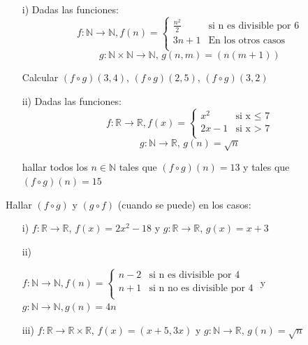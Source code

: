 \documentclass[10pt]{article}
\begin{document}
\begin{ej}
\begin{itemize}
	\item[i)] Dadas las funciones:
		\begin{displaymath}
			f: \mathbb{N} \rightarrow \mathbb{N}, f(n)=\left\{\begin{array}{cc}
				 \frac{n^2}{2} & \mbox{si n es divisible por 6} \\
						3n + 1 & \mbox{En los otros casos}  \\
			 \end{array}\right.	
		\end{displaymath}	
		$$g : \mathbb{N} \times \mathbb{N} \rightarrow \mathbb{N}, \, g(n, m) = (n(m + 1))$$
	
	Calcular $(f \circ g)(3,4) $, $(f \circ g)(2,5) $, $(f \circ g)(3,2) $ 				
	\item[ii)] Dadas las funciones:
			\begin{displaymath}
				f: \mathbb{R} \rightarrow \mathbb{R}, f(x)=\left\{\begin{array}{cc}
				 x^2 & \mbox{si x $\leq$ 7} \\
						2x - 1 & \mbox{si x > 7}  \\
			 \end{array}\right.	
		\end{displaymath}	
			$$g : \mathbb{N} \rightarrow \mathbb{R}  , \, g(n) = \sqrt{n}$$
	
	hallar todos los $n \in \mathbb{N}$ tales que $(f \circ g)(n) = 13$ y tales que $(f \circ g)(n) = 15$
\end{itemize}
\end{ej}

\begin{ej}
Hallar $(f \circ g)$ y $(g \circ f)$ (cuando se puede) en los casos:
\begin{itemize}
	\item[i)] $f : \mathbb{R} \rightarrow \mathbb{R}$, $f(x) = 2 x^2 - 18$ y $g : \mathbb{R} \rightarrow \mathbb{R}$, $g(x) =  x + 3$
	\item[ii)] 
	\begin{flushleft}		
	 	
				$f : \mathbb{N} \rightarrow \mathbb{N}, f(n)=\left\{\begin{array}{cc}
				 n - 2 & \mbox{si n es divisible por 4} \\
						n + 1 & \mbox{si n no es divisible por 4}  \\
			 \end{array}\right.$	
		y
			 $g: \mathbb{N} \rightarrow \mathbb{N}, g(n) = 4 n$
	\end{flushleft}	
	\item[iii)] $f : \mathbb{R} \rightarrow \mathbb{R} \times \mathbb{R}$, $f(x) = (x + 5, 3 x)$ y $g : \mathbb{N} \rightarrow \mathbb{R}$, $g(n) = \sqrt{n}$
	
\end{itemize}

\end{ej}
\end{document}
